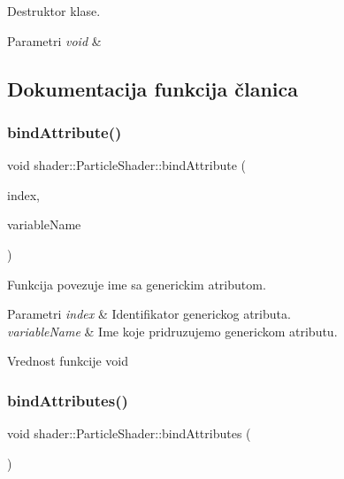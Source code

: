 Destruktor klase. 


\begin{DoxyParams}{Parametri}
{\em void} & \\
\hline
\end{DoxyParams}


\subsection{Dokumentacija funkcija članica}
\mbox{\label{classshader_1_1ParticleShader_aa611292ef9c9c034468bd2a9328a9b92}} 
\subsubsection{\texorpdfstring{bind\+Attribute()}{bindAttribute()}}
{\footnotesize\ttfamily void shader\+::\+Particle\+Shader\+::bind\+Attribute (\begin{DoxyParamCaption}\item[{int}]{index,  }\item[{const char $\ast$}]{variable\+Name }\end{DoxyParamCaption})}



Funkcija povezuje ime sa generickim atributom. 


\begin{DoxyParams}{Parametri}
{\em index} & Identifikator generickog atributa. \\
\hline
{\em variable\+Name} & Ime koje pridruzujemo generickom atributu. \\
\hline
\end{DoxyParams}
\begin{DoxyReturn}{Vrednost funkcije}
void 
\end{DoxyReturn}
\mbox{\label{classshader_1_1ParticleShader_a61970d8c092a983f998e00352cb27783}} 
\subsubsection{\texorpdfstring{bind\+Attributes()}{bindAttributes()}}
{\footnotesize\ttfamily void shader\+::\+Particle\+Shader\+::bind\+Attributes (\begin{DoxyParamCaption}\item[{void}]{ }\end{DoxyParamCaption})}



